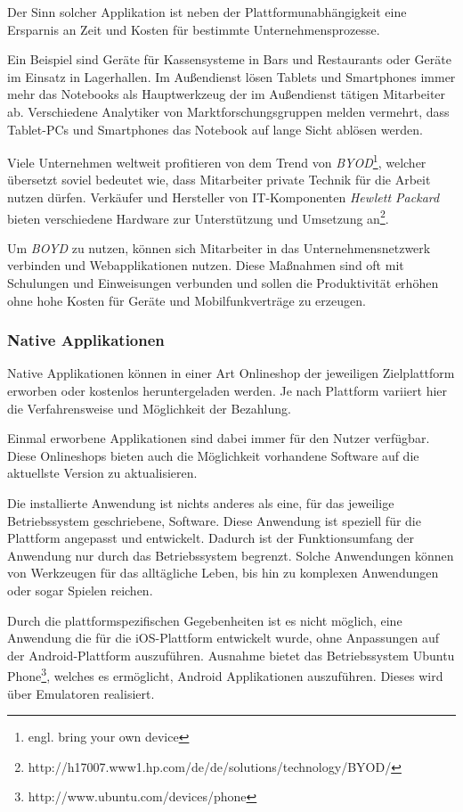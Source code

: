 Der Sinn solcher Applikation ist neben der Plattformunabhängigkeit eine Ersparnis an Zeit und Kosten für bestimmte Unternehmensprozesse.

Ein Beispiel sind Geräte für Kassensysteme in Bars und Restaurants oder Geräte im Einsatz in Lagerhallen. Im Außendienst lösen Tablets und Smartphones immer mehr das Notebooks als Hauptwerkzeug der im Außendienst tätigen Mitarbeiter ab. Verschiedene Analytiker von Marktforschungsgruppen melden vermehrt, dass Tablet-PCs und Smartphones das Notebook auf lange Sicht ablösen werden\cite{blogpost_1}.

Viele Unternehmen weltweit\cite{news_1} profitieren von dem Trend von \textit{BYOD}\footnote{engl. bring your own device}, welcher übersetzt soviel bedeutet wie, dass Mitarbeiter private Technik für die Arbeit nutzen dürfen. Verkäufer und Hersteller von IT-Komponenten \emph{Hewlett Packard} bieten verschiedene Hardware zur Unterstützung und Umsetzung an\footnote{http://h17007.www1.hp.com/de/de/solutions/technology/BYOD/}.

 Um \textit{BOYD} zu nutzen, können sich Mitarbeiter in das Unternehmensnetzwerk verbinden und Webapplikationen nutzen. Diese Maßnahmen sind oft mit Schulungen und Einweisungen verbunden und sollen die Produktivität erhöhen ohne hohe Kosten für Geräte und Mobilfunkverträge zu erzeugen.

\subsubsection{Native Applikationen}
\label{natand}

Native Applikationen können in einer Art Onlineshop der jeweiligen Zielplattform erworben oder kostenlos heruntergeladen werden. Je nach Plattform variiert hier die Verfahrensweise und Möglichkeit der Bezahlung.

Einmal erworbene Applikationen sind dabei immer für den Nutzer verfügbar. Diese Onlineshops bieten auch die Möglichkeit vorhandene Software auf die aktuellste Version zu aktualisieren.

Die installierte Anwendung ist nichts anderes als eine, für das jeweilige Betriebssystem geschriebene, Software. Diese Anwendung ist speziell für die Plattform angepasst und entwickelt. Dadurch ist der Funktionsumfang der Anwendung nur durch das Betriebssystem begrenzt. Solche Anwendungen können von Werkzeugen für das alltägliche Leben, bis hin zu komplexen Anwendungen oder sogar Spielen reichen.

Durch die plattformspezifischen Gegebenheiten ist es nicht möglich, eine Anwendung die für die iOS-Plattform entwickelt wurde, ohne Anpassungen auf der Android-Plattform auszuführen. Ausnahme bietet das Betriebssystem Ubuntu Phone\footnote{http://www.ubuntu.com/devices/phone}, welches es ermöglicht, Android Applikationen auszuführen. Dieses wird über Emulatoren realisiert. 

